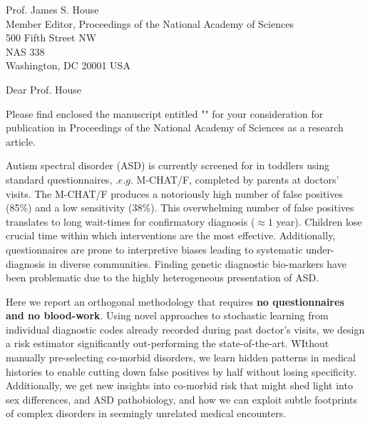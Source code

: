 \documentclass[9pt,onecolumn,compsoc]{IEEEtran}
\newcommand{\Space}{\vspace{10pt}}
\def\EDITOR{Prof. James S. House}
\def\BEDITOR{Prof. House\xspace}
\def\JNAME{Proceedings of the National Academy of Sciences\xspace}
\def\JADDR{500 Fifth Street NW\\
NAS 338\\
Washington, DC 20001 USA}
\begin{document}
\parskip=12pt
\parindent=0pt
\Space
\Space
\fontsize{11}{12}\selectfont
\Space
\Space

\EDITOR\\
Member Editor, \JNAME\\
\JADDR

Dear \BEDITOR

Please find enclosed the  manuscript entitled "\textbf{\TITLE}" for your consideration for publication in \JNAME as a research article. 

Autism spectral disorder (ASD) is currently  screened for in toddlers using standard questionnaires, $.e.g.$ M-CHAT/F, completed by parents at doctors' visits. The M-CHAT/F produces a notoriously high number of false positives (85\%) and  a low sensitivity (38\%). This overwhelming number of false positives translates to long wait-times for confirmatory diagnosis ($\approx 1$ year). Children lose crucial time within which  interventions are the most effective.  Additionally, questionnaires are prone to interpretive biases leading to systematic under-diagnosis in diverse communities.  Finding genetic diagnostic bio-markers have been problematic due to  the highly heterogeneous presentation of ASD.

Here we report an orthogonal methodology that requires \textbf{no questionnaires and no blood-work}. Using novel approaches to stochastic learning from  individual diagnostic codes already recorded during past doctor's visits, we design  a  risk estimator significantly out-performing the state-of-the-art. WIthout manually pre-selecting co-morbid disorders, we learn hidden patterns in medical histories to enable cutting down false positives by half without losing specificity.
Additionally, we get new insights into co-morbid risk that might shed light into sex differences, and ASD pathobiology, and how we can exploit subtle footprints of complex disorders in seemingly unrelated
medical encounters.

\end{document}
